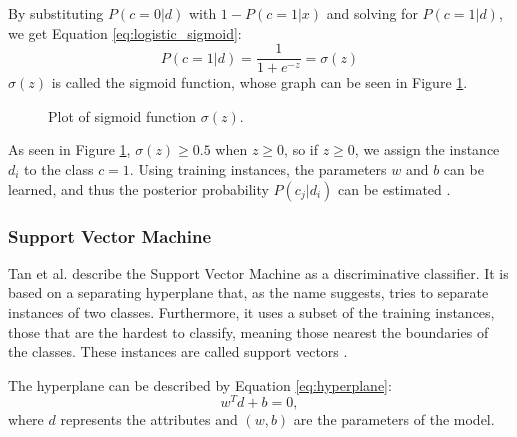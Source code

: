 By substituting $P(c=0|d)$ with $1 - P(c=1|x)$ and solving for $P(c=1|d)$, we get Equation \eqref{eq:logistic_sigmoid}:
        {\begin{equation}
            \label{eq:logistic_sigmoid}
                P(c=1|d) = \frac{1}{1+e^{-z}} = \sigma(z)
        \end{equation}}
$\sigma(z)$ is called the sigmoid function, whose graph can be seen in Figure \ref{fig:sigmoid}.
        \begin{figure}[h!]
        \centering

    \caption{Plot of sigmoid function $\sigma(z)$.}
      \label{fig:sigmoid}
\end{figure}
As seen in Figure \ref{fig:sigmoid}, $\sigma(z) \geq 0.5$ when $z \geq 0$, so if $z \geq 0$, we assign the instance $d_i$ to the class $c = 1$. Using training instances, the parameters $w$ and $b$ can be learned, and thus the posterior probability $P(c_j|d_i)$ can be estimated \cite{DBLP:books/aw/TanSKK2019}.

\subsubsection{Support Vector Machine}
Tan et al. describe the Support Vector Machine as a discriminative classifier. It is based on a separating hyperplane that, as the name suggests, tries to separate instances of two classes. Furthermore, it uses a subset of the training instances, those that are the hardest to classify, meaning those nearest the boundaries of the classes. These instances are called support vectors \cite{DBLP:books/aw/TanSKK2019}.

The hyperplane can be described by Equation \eqref{eq:hyperplane}:
    \begin{equation}
            \label{eq:hyperplane}
                w^Td + b = 0,
        \end{equation}
    where $d$ represents the attributes and $(w, b)$ are the parameters of the model. 
    
